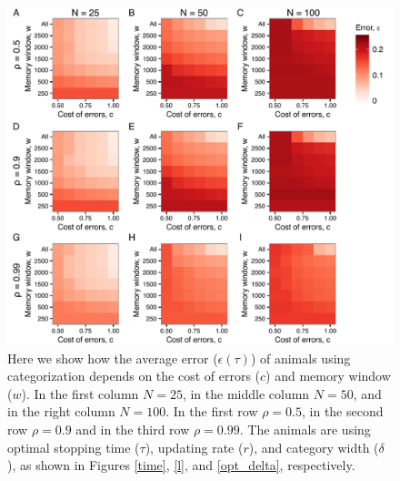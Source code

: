 \begin{figure}
\includegraphics[width=6.85in]{figures/error_heat_maps.pdf}
\caption{\sffamily\small\textbf{} Here we show how the average error ($\epsilon(\tau)$) of animals using categorization depends on the cost of errors ($c$) and memory window ($w$). In the first column $N=25$, in the middle column $N=50$, and in the right column $N=100$. In the first  row $\rho=0.5$, in the second row $\rho=0.9$ and in the third row $\rho=0.99$. The animals are using optimal stopping time ($\tau$), updating rate ($r$), and category width ($\delta$), as shown in Figures \ref{time}, \ref{l}, and \ref{opt_delta}, respectively. }
\label{error}
\end{figure}

